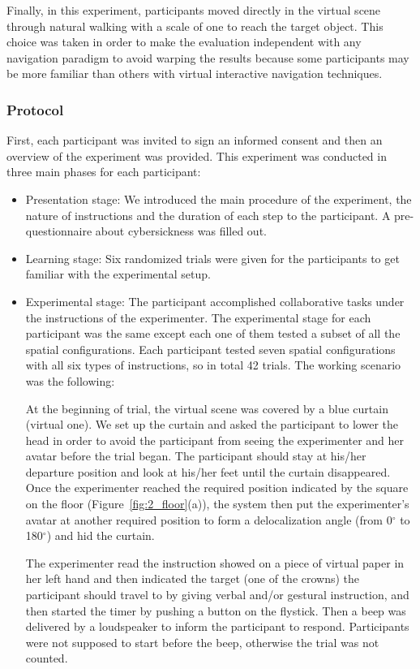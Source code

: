 Finally, in this experiment, participants moved directly in the virtual scene through natural walking with a scale of one to reach the target object. This choice was taken in order to make the evaluation independent with any navigation paradigm to avoid warping the results because some participants may be more familiar than others with virtual interactive navigation techniques.


\subsubsection{Protocol}
First, each participant was invited to sign an informed consent and then an overview of the experiment was provided. This experiment was conducted in three main phases for each participant:

\begin{itemize}
\item Presentation stage: We introduced the main procedure of the experiment, the nature of instructions and the duration of each step to the participant. A pre-questionnaire about cybersickness was filled out.
\item Learning stage: Six randomized trials were given for the participants to get familiar with the experimental setup.
\item Experimental stage: The participant accomplished collaborative tasks under the instructions of the experimenter. The experimental stage for each participant was the same except each one of them tested a subset of all the spatial configurations. Each participant tested seven spatial configurations with all six types of instructions, so in total 42 trials. The working scenario was the following:

At the beginning of trial, the virtual scene was covered by a blue curtain (virtual one). We set up the curtain and asked the participant to lower the head in order to avoid the participant from seeing the experimenter and her avatar before the trial began. The participant should stay at his/her departure position and look at his/her feet until the curtain disappeared. Once the experimenter reached the required position indicated by the square on the floor (Figure~\ref{fig:2_floor}(a)), the system then put the experimenter's avatar at another required position to form a delocalization angle (from 0$^\circ$ to 180$^\circ$) and hid the curtain.

The experimenter read the instruction showed on a piece of virtual paper in her left hand and then indicated the target (one of the crowns) the participant should travel to by giving verbal and/or gestural instruction, and then started the timer by pushing a button on the flystick. Then a beep was delivered by a loudspeaker to inform the participant to respond. Participants were not supposed to start before the beep, otherwise the trial was not counted.


\end{itemize}
